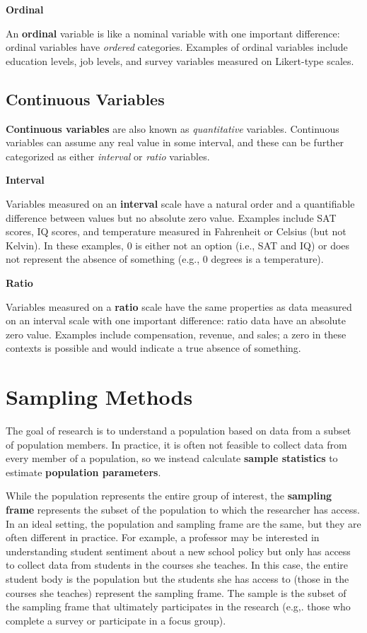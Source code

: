 \documentclass[
]{book}
\begin{document}
\textbf{Ordinal}

An \textbf{ordinal} variable is like a nominal variable with one important difference: ordinal variables have \emph{ordered} categories. Examples of ordinal variables include education levels, job levels, and survey variables measured on Likert-type scales.

\hypertarget{continuous-variables}{%
\subsection{Continuous Variables}\label{continuous-variables}}

\textbf{Continuous variables} are also known as \emph{quantitative} variables. Continuous variables can assume any real value in some interval, and these can be further categorized as either \emph{interval} or \emph{ratio} variables.

\textbf{Interval}

Variables measured on an \textbf{interval} scale have a natural order and a quantifiable difference between values but no absolute zero value. Examples include SAT scores, IQ scores, and temperature measured in Fahrenheit or Celsius (but not Kelvin). In these examples, 0 is either not an option (i.e., SAT and IQ) or does not represent the absence of something (e.g., 0 degrees is a temperature).

\textbf{Ratio}

Variables measured on a \textbf{ratio} scale have the same properties as data measured on an interval scale with one important difference: ratio data have an absolute zero value. Examples include compensation, revenue, and sales; a zero in these contexts is possible and would indicate a true absence of something.

\hypertarget{sampling-methods}{%
\section{Sampling Methods}\label{sampling-methods}}

The goal of research is to understand a population based on data from a subset of population members. In practice, it is often not feasible to collect data from every member of a population, so we instead calculate \textbf{sample statistics} to estimate \textbf{population parameters}.

While the population represents the entire group of interest, the \textbf{sampling frame} represents the subset of the population to which the researcher has access. In an ideal setting, the population and sampling frame are the same, but they are often different in practice. For example, a professor may be interested in understanding student sentiment about a new school policy but only has access to collect data from students in the courses she teaches. In this case, the entire student body is the population but the students she has access to (those in the courses she teaches) represent the sampling frame. The sample is the subset of the sampling frame that ultimately participates in the research (e.g,. those who complete a survey or participate in a focus group).
\end{document}
